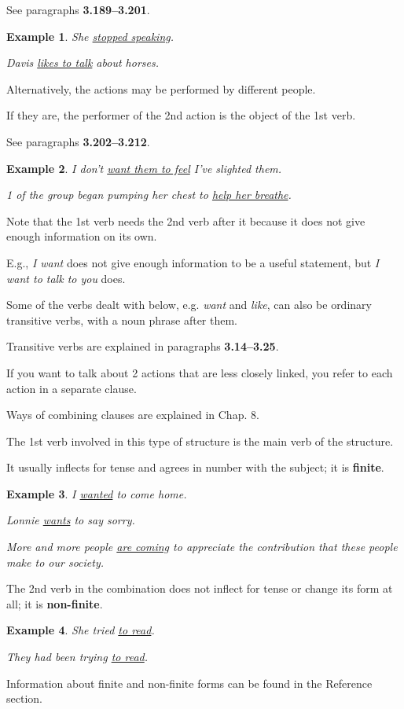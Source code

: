 \documentclass[oneside]{book}
\numberwithin{equation}{section}
\newtheorem{example}{Example}[section]
\begin{document}
See paragraphs \textbf{3.189--3.201}.
\begin{example}
    She \underline{stopped speaking}.
    
    Davis \underline{likes to talk} about horses.
\end{example}
Alternatively, the actions may be performed by different people.

If they are, the performer of the 2nd action is the object of the 1st verb.

See paragraphs \textbf{3.202--3.212}.
\begin{example}
    I don't \underline{want them to feel} I've slighted them.
    
    1 of the group began pumping her chest to \underline{help her breathe}.
\end{example}
%
\noindent{} Note that the 1st verb needs the 2nd verb after it because it does not give enough information on its own.

E.g., \textit{I want} does not give enough information to be a useful statement, but \textit{I want to talk to you} does.

%
Some of the verbs dealt with below, e.g. \textit{want} and \textit{like}, can also be ordinary transitive verbs, with a noun phrase after them.

Transitive verbs are explained in paragraphs \textbf{3.14--3.25}.

%
\noindent{} If you want to talk about 2 actions that are less closely linked, you refer to each action in a separate clause.

Ways of combining clauses are explained in Chap. 8.

%
\noindent{} The 1st verb involved in this type of structure is the main verb of the structure.

It usually inflects for tense and agrees in number with the subject; it is \textbf{finite}.
\begin{example}
    I \underline{wanted} to come home.
    
    Lonnie \underline{wants} to say sorry.
    
    More and more people \underline{are coming} to appreciate the contribution that these people make to our society.
\end{example}
%
\noindent{} The 2nd verb in the combination does not inflect for tense or change its form at all; it is \textbf{non-finite}.
\begin{example}
    She tried \underline{to read}.
    
    They had been trying \underline{to read}.
\end{example}
Information about finite and non-finite forms can be found in the Reference section.
\end{document}
